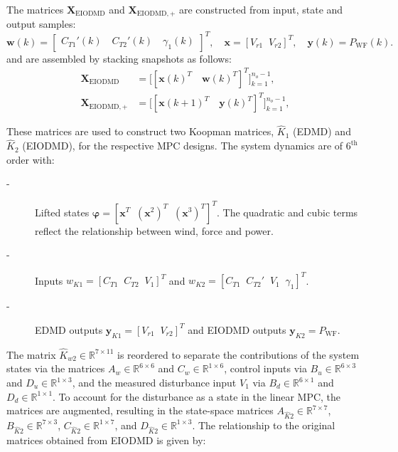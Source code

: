 The matrices $\bm{X}_{\text{EIODMD}}$ and $\bm{X}_{\text{EIODMD},+}$ are constructed from input, state and output samples:
\begin{equation}
    \bm{w}(k) = \begin{bmatrix} C_{T1}'(k) \quad C_{T2}'(k) \quad \gamma_1(k) \end{bmatrix}^T, \quad \bm{x} = [V_{r1} \;\; V_{r2}]^T,  \quad 
    \bm{y}(k) = P_{\text{WF}}(k).
\end{equation}
and are assembled by stacking snapshots as follows:
\begin{align}
    \bm{X}_{\text{EIODMD}} &= \bigl[ [\bm{x}(k)^T \quad \bm{w}(k)^T]^T \bigr]_{k=1}^{n_o-1}, \\
    \bm{X}_{\text{EIODMD},+} &= \bigl[ [\bm{x}(k+1)^T \quad \bm{y}(k)^T]^T \bigr]_{k=1}^{n_o-1},
\end{align}

These matrices are used to construct two Koopman matrices, $\hat{K}_1$ (EDMD) and $\hat{K}_2$ (EIODMD), for the respective MPC designs. The system dynamics are of $6^{\text{th}}$ order with:
\begin{description}
    \item[-] Lifted states $\bm{\varphi} = [\bm{x}^T \;\; (\bm{x}^2)^T \;\; (\bm{x}^3)^T]^T$. The quadratic and cubic terms reflect the relationship between wind, force and power.
    \item[-] Inputs $w_{K1} = [C_{T1} \;\; C_{T2} \;\; V_1]^T$ and $w_{K2} = [C_{T1} \;\; C_{T2}'\;\; V_1\;\; \gamma_1]^T$.
    \item[-] EDMD outputs $\bm{y}_{K1} = [V_{r1} \;\; V_{r2}]^T$ and EIODMD outputs $\bm{y}_{K2} = P_{\text{WF}}$.
\end{description}

The matrix $\hat{K}_{w2} \in \mathbb{R}^{7\times11}$ is reordered to separate the contributions of the system states via the matrices $A_w \in \mathbb{R}^{6\times6}$ and $C_w \in \mathbb{R}^{1\times6}$, control inputs via $B_u \in \mathbb{R}^{6\times3}$ and $D_u \in \mathbb{R}^{1\times3}$, and the measured disturbance input $V_1$ via $B_d \in \mathbb{R}^{6\times1}$ and $D_d \in \mathbb{R}^{1\times1}$. To account for the disturbance as a state in the linear MPC, the matrices are augmented, resulting in the state-space matrices $A_{\hat{K}2} \in \mathbb{R}^{7\times7}$, $B_{\hat{K}2} \in \mathbb{R}^{7\times3}$, $C_{\hat{K}2} \in \mathbb{R}^{1\times7}$, and $D_{\hat{K}2} \in \mathbb{R}^{1\times3}$. The relationship to the original matrices obtained from EIODMD is given by:

